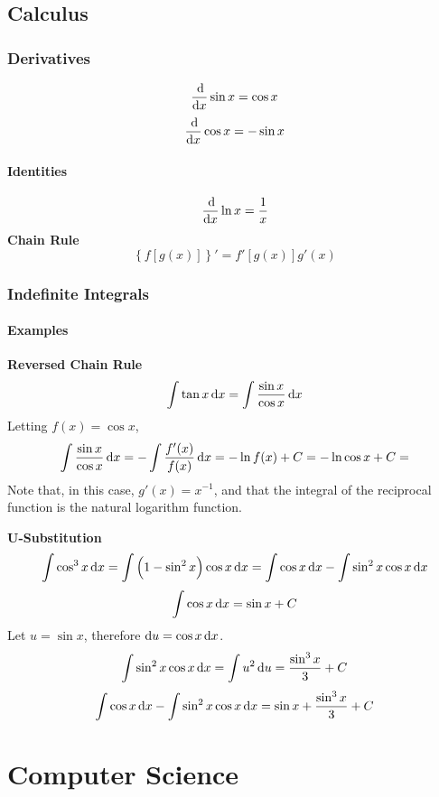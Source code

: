 \documentclass[oneside]{book} %
\theoremstyle{plain}
\newcommand*\reciprocal[1]{\frac{1}{#1}}
\begin{document}

\chapter{Calculus}
\section{Derivatives}
\[\frac{\dif}{\dif x} \sin x = \cos x\]
\[\frac{\dif}{\dif x} \cos x = -\sin x\]

\subsection{Identities}
\[\frac{\dif}{\dif x} \ln x = \reciprocal{x}\]
\textbf{Chain Rule}
\[\left\{f\left[g\left(x\right)\right]\right\}'
= f'\left[g\left(x\right)\right] g'\left(x\right)\]

\section{Indefinite Integrals}
\subsection{Examples}
\textbf{Reversed Chain Rule}
\[\int \tan x \dif x = \int \frac{\sin{x}}{\cos{x}} \dif x\]
Letting \(f(x) = \cos x\),
\[\int \frac{\sin{x}}{\cos{x}} \dif x = - \int \frac{f'(x)}{f(x)} \dif x
= - \ln{f(x)} + C = - \ln{\cos x} + C = \]
Note that, in this case, \(g'(x) = x^{-1}\), and that the integral of the
reciprocal function is the natural logarithm function.

\textbf{U-Substitution}
\[\int \cos^3 x \dif x
= \int \left( 1 - \sin^2 x \right) \cos x \dif x
= \int \cos x \dif x - \int \sin^2 x \cos x \dif x\]
\[\int \cos x \dif x = \sin x + C\]
Let \(u = \sin x\), therefore \(\dif u = \cos x \dif x\).
\[\int \sin^2 x \cos x \dif x = \int u^2 \dif u = \frac{\sin^3 x}{3} + C\]
\[\int \cos x \dif x - \int \sin^2 x \cos x \dif x
= \sin x + \frac{\sin^3 x}{3} + C\]


\part{Computer Science}

\end{document}
